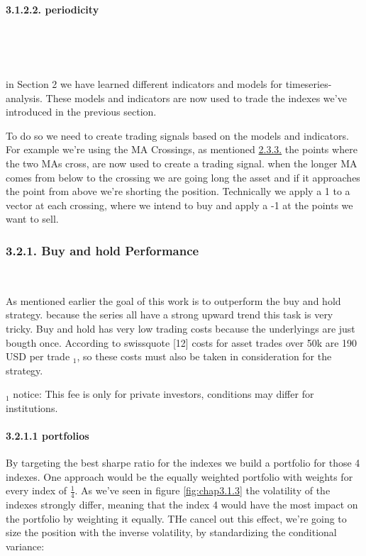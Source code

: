 \documentclass[
]{article}
\begin{document}
\newpage

\hypertarget{periodicity}{%
\paragraph{3.1.2.2. periodicity}\label{periodicity}}

~

\newpage

~

in Section 2 we have learned different indicators and models for
timeseries-analysis. These models and indicators are now used to trade
the indexes we've introduced in the previous section.

To do so we need to create trading signals based on the models and
indicators. For example we're using the MA Crossings, as mentioned
\protect\hyperlink{Maux5cux2520crossings}{2.3.3.} the points where the
two MAs cross, are now used to create a trading signal. when the longer
MA comes from below to the crossing we are going long the asset and if
it approaches the point from above we're shorting the position.
Technically we apply a 1 to a vector at each crossing, where we intend
to buy and apply a -1 at the points we want to sell.

\hypertarget{buy-and-hold-performance}{%
\subsubsection{3.2.1. Buy and hold
Performance}\label{buy-and-hold-performance}}

~

As mentioned earlier the goal of this work is to outperform the buy and
hold strategy. because the series all have a strong upward trend this
task is very tricky. Buy and hold has very low trading costs because the
underlyings are just bougth once. According to swissquote {[}12{]} costs
for asset trades over 50k are 190 USD per trade \(_1\), so these costs
must also be taken in consideration for the strategy.

\(_1\) notice: This fee is only for private investors, conditions may
differ for institutions.

\hypertarget{portfolios}{%
\paragraph{3.2.1.1 portfolios}\label{portfolios}}

By targeting the best sharpe ratio for the indexes we build a portfolio
for those 4 indexes. One approach would be the equally weighted
portfolio with weights for every index of \(\frac{1}{4}\). As we've seen
in figure \ref{fig:chap3.1.3} the volatility of the indexes strongly
differ, meaning that the index 4 would have the most impact on the
portfolio by weighting it equally. THe cancel out this effect, we're
going to size the position with the inverse volatility, by standardizing
the conditional variance:
\end{document}
